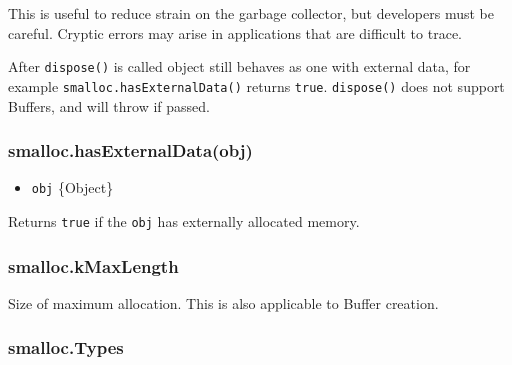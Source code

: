 This is useful to reduce strain on the garbage collector, but developers
must be careful. Cryptic errors may arise in applications that are
difficult to trace.

\begin{Shaded}
\begin{Highlighting}[]
 \NormalTok{(}\NormalTok{);}
 \NormalTok{(}\NormalTok{);}


\NormalTok{, }\NormalTok{);}

\end{Highlighting}
\end{Shaded}

After \texttt{dispose()} is called object still behaves as one with
external data, for example \texttt{smalloc.hasExternalData()} returns
\texttt{true}. \texttt{dispose()} does not support Buffers, and will
throw if passed.

\subsubsection{smalloc.hasExternalData(obj)}\label{smalloc.hasexternaldataobj}

\begin{itemize}
\itemsep1pt\parskip0pt
\item
  \texttt{obj} \{Object\}
\end{itemize}

Returns \texttt{true} if the \texttt{obj} has externally allocated
memory.

\subsubsection{smalloc.kMaxLength}\label{smalloc.kmaxlength}

Size of maximum allocation. This is also applicable to Buffer creation.

\subsubsection{smalloc.Types}\label{smalloc.types}

